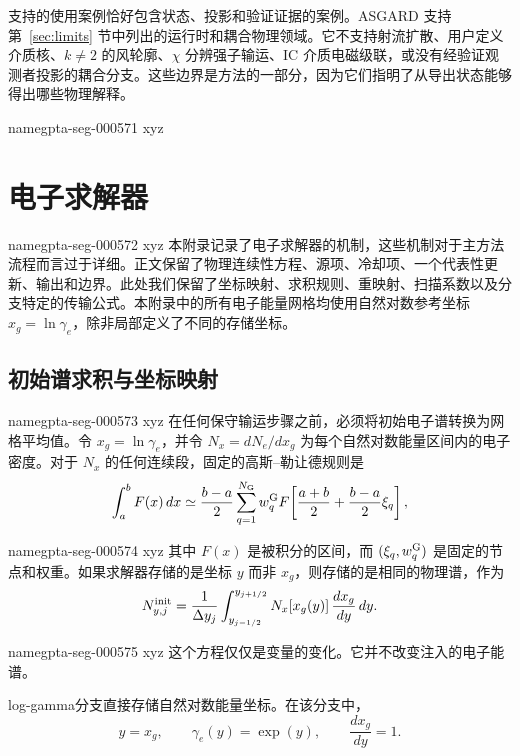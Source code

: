 \documentclass[twocolumn]{aastex702}
\makeatletter
\providecommand{\gptareaderanchor}[1]{\pdfdest name{#1} xyz}%
\providecommand{\gptareaderanchor}[1]{\special{pdf:dest (#1) [ @thispage /XYZ @xpos @ypos null ]}}%
\makeatother
\begin{document}
支持的使用案例恰好包含状态、投影和验证证据的案例。ASGARD 支持第~\ref{sec:limits} 节中列出的运行时和耦合物理领域。它不支持射流扩散、用户定义介质核、\(k\ne2\) 的风轮廓、\(\chi\) 分辨强子输运、IC 介质电磁级联，或没有经验证观测者投影的耦合分支。这些边界是方法的一部分，因为它们指明了从导出状态能够得出哪些物理解释。

\appendix

\gptareaderanchor{gpta-seg-000571}%
\setcounter{figure}{0}
\renewcommand{\thefigure}{A\arabic{figure}}
\renewcommand{\theHfigure}{A\arabic{figure}}

\section{电子求解器} \label{app:electron-solvers}


\gptareaderanchor{gpta-seg-000572}%
本附录记录了电子求解器的机制，这些机制对于主方法流程而言过于详细。正文保留了物理连续性方程、源项、冷却项、一个代表性更新、输出和边界。此处我们保留了坐标映射、求积规则、重映射、扫描系数以及分支特定的传输公式。本附录中的所有电子能量网格均使用自然对数参考坐标 \(x_g=\ln\gamma_e\)，除非局部定义了不同的存储坐标。

\subsection{初始谱求积与坐标映射}


\gptareaderanchor{gpta-seg-000573}%
在任何保守输运步骤之前，必须将初始电子谱转换为网格平均值。令 \(x_g=\ln\gamma_e\)，并令 \(N_x=dN_e/dx_g\) 为每个自然对数能量区间内的电子密度。对于 \(N_x\) 的任何连续段，固定的高斯--勒让德规则是
\begin{equation}
\int_a^b F(x)\,dx\simeq
\frac{b-a}{2}\sum_{q=1}^{N_{\rm G}} w_q^{\rm G}
F\!\left[\frac{a+b}{2}+\frac{b-a}{2}\xi_q\right],
\end{equation}

\gptareaderanchor{gpta-seg-000574}%
其中 \(F(x)\) 是被积分的区间，而 \((\xi_q,w_q^{\rm G})\) 是固定的节点和权重。如果求解器存储的是坐标 \(y\) 而非 \(x_g\)，则存储的是相同的物理谱，作为
\begin{equation}
N_{y,j}^{\rm init}=\frac{1}{\Delta y_j}
\int_{y_{j-1/2}}^{y_{j+1/2}}
N_x[x_g(y)]\,\frac{dx_g}{dy}\,dy .
\end{equation}

\gptareaderanchor{gpta-seg-000575}%
这个方程仅仅是变量的变化。它并不改变注入的电子能谱。

log-gamma分支直接存储自然对数能量坐标。在该分支中，
\begin{equation}
y=x_g,\qquad \gamma_e(y)=\exp(y),\qquad \frac{dx_g}{dy}=1.
\end{equation}
\end{document}
